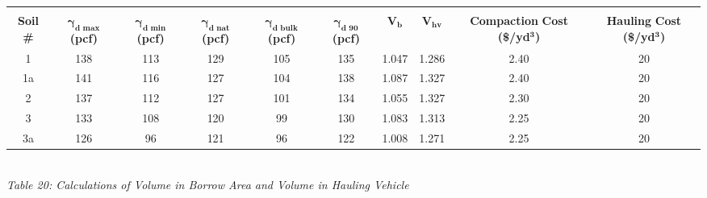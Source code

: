 \documentclass{article}
\begin{document}
\begin{center}
    \vspace{6mm}
    \begin{tabular}{|c|ccccccccc|}
        \hline
        &&&&&&&&&\\
        \textbf{Soil \#} & \shortstack[c]{\textbf{$\bm{\gamma_{d\text{ max}}}$}\\\textbf{(pcf)}} & \shortstack[c]{\textbf{$\bm{\gamma_{d\text{ min}}}$}\\\textbf{(pcf)}} & \shortstack[c]{\textbf{$\bm{\gamma_{d\text{ nat}}}$}\\\textbf{(pcf)}} & \shortstack[c]{\textbf{$\bm{\gamma_{d\text{ bulk}}}$}\\\textbf{(pcf)}} & \shortstack[c]{\textbf{$\bm{\gamma_{d\text{ 90}}}$}\\\textbf{(pcf)}} & $\bm{V_b}$ & $\bm{V_{hv}}$ & \shortstack[c]{\textbf{Compaction}\\ \textbf{Cost (\$/yd$\bm{^3}$)}} & \shortstack[c]{\textbf{Hauling}\\ \textbf{Cost (\$/yd$\bm{^3}$)}}\\\hline
        1  & 138 & 113 & 129 & 105 & 135 & 1.047 & 1.286 & 2.40 & 20 \\
        1a & 141 & 116 & 127 & 104 & 138 & 1.087 & 1.327 & 2.40 & 20 \\
        2  & 137 & 112 & 127 & 101 & 134 & 1.055 & 1.327 & 2.30 & 20 \\
        3  & 133 & 108 & 120 & 99  & 130 & 1.083 & 1.313 & 2.25 & 20 \\
        3a & 126 & 96  & 121 & 96  & 122 & 1.008 & 1.271 & 2.25 & 20\\\hline         
    \end{tabular}
    \vspace{0mm}
    \emph{\\Table 20: Calculations of Volume in Borrow Area and Volume in Hauling Vehicle\\}



\end{center}
\end{document}
